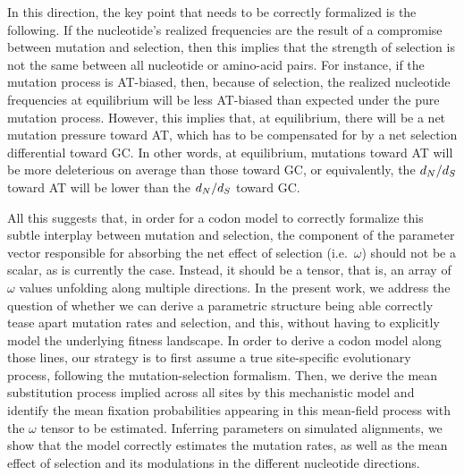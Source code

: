 In this direction, the key point that needs to be correctly formalized is the following.
If the nucleotide's realized frequencies are the result of a compromise between mutation and selection, then this implies that the strength of selection is not the same between all nucleotide or amino-acid pairs.
For instance, if the mutation process is AT-biased, then, because of selection, the realized nucleotide frequencies at equilibrium will be less AT-biased than expected under the pure mutation process.
However, this implies that, at equilibrium, there will be a net mutation pressure toward AT, which has to be compensated for by a net selection differential toward GC.
In other words, at equilibrium, mutations toward AT will be more deleterious on average than those toward GC, or equivalently, the $d_N / d_S$ toward AT will be lower than the $d_N / d_S$ toward GC.

All this suggests that, in order for a codon model to correctly formalize this subtle interplay between mutation and selection, the component of the parameter vector responsible for absorbing the net effect of selection (i.e.~$\omega$) should not be a scalar, as is currently the case.
Instead, it should be a tensor, that is, an array of $\omega$ values unfolding along multiple directions.
In the present work, we address the question of whether we can derive a parametric structure being able correctly tease apart mutation rates and selection, and this, without having to explicitly model the underlying fitness landscape.
In order to derive a codon model along those lines, our strategy is to first assume a true site-specific evolutionary process, following the mutation-selection formalism.
Then, we derive the mean substitution process implied across all sites by this mechanistic model and identify the mean fixation probabilities appearing in this mean-field process with the $\omega$ tensor to be estimated.
Inferring parameters on simulated alignments, we show that the model correctly estimates the mutation rates, as well as the mean effect of selection and its modulations in the different nucleotide directions.



